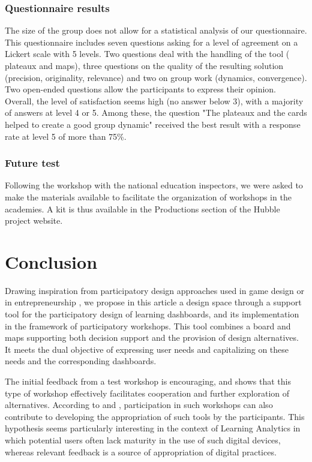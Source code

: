 \documentclass[preprint,12pt]{elsarticle}
\begin{document}
\subsubsection{Questionnaire results}
The size of the group does not allow for a statistical analysis of our questionnaire. This questionnaire includes seven questions asking for a level of agreement on a Lickert scale with 5 levels. Two questions deal with the handling of the tool ( plateaux and maps), three questions on the quality of the resulting solution (precision, originality, relevance) and two on group work (dynamics, convergence). Two open-ended questions allow the participants to express their opinion. Overall, the level of satisfaction seems high (no answer below 3), with a majority of answers at level 4 or 5. Among these, the question "The plateaux and the cards helped to create a good group dynamic" received the best result with a response rate at level 5 of more than 75\%.

\subsubsection{Future test}
Following the workshop with the national education inspectors, we were asked to make the materials available to facilitate the organization of workshops in the academies. A kit is thus available in the Productions section of the Hubble project website.




\section{Conclusion}
Drawing inspiration from participatory design approaches used in game design \cite{hallifax2018design} or in entrepreneurship \cite{osterwalder2010business}, we propose in this article a design space through a support tool for the participatory design of learning dashboards, and its implementation in the framework of participatory workshops. This tool combines a board and maps supporting both decision support and the provision of design alternatives. It meets the dual objective of expressing user needs and capitalizing on these needs and the corresponding dashboards. 

The initial feedback from a test workshop is encouraging, and shows that this type of workshop effectively facilitates cooperation and further exploration of alternatives. According to \citet{mackay1997radicalement} and \citet{knibbe2016}, participation in such workshops can also contribute to developing the appropriation of such tools by the participants. This hypothesis seems particularly interesting in the context of Learning Analytics in which potential users often lack maturity in the use of such digital devices, whereas relevant feedback is a source of appropriation of digital practices.



\end{document}

